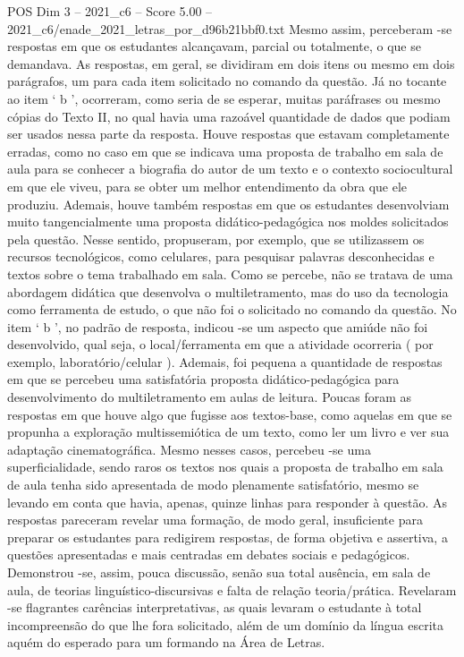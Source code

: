 \begin{textsample}{POS Dim 3 – 2021\_c6 – Score 5.00 – 2021\_c6/enade\_2021\_letras\_por\_d96b21bbf0.txt}
Mesmo assim, perceberam -se respostas em que os estudantes alcançavam, parcial ou totalmente, o que se demandava.
As respostas, em geral, se dividiram em dois itens ou mesmo em dois parágrafos, um para cada item solicitado no comando da questão.
Já no tocante ao item ‘ b ’, ocorreram, como seria de se esperar, muitas paráfrases ou mesmo cópias do Texto II, no qual havia uma razoável quantidade de dados que podiam ser usados nessa parte da resposta.
Houve respostas que estavam completamente erradas, como no caso em que se indicava uma proposta de trabalho em sala de aula para se conhecer a biografia do autor de um texto e o contexto sociocultural em que ele viveu, para se obter um melhor entendimento da obra que ele produziu.
Ademais, houve também respostas em que os estudantes desenvolviam muito tangencialmente uma proposta didático-pedagógica nos moldes solicitados pela questão.
Nesse sentido, propuseram, por exemplo, que se utilizassem os recursos tecnológicos, como celulares, para pesquisar palavras desconhecidas e textos sobre o tema trabalhado em sala.
Como se percebe, não se tratava de uma abordagem didática que desenvolva o multiletramento, mas do uso da tecnologia como ferramenta de estudo, o que não foi o solicitado no comando da questão.
No item ‘ b ’, no padrão de resposta, indicou -se um aspecto que amiúde não foi desenvolvido, qual seja, o local/ferramenta em que a atividade ocorreria ( por exemplo, laboratório/celular ).
Ademais, foi pequena a quantidade de respostas em que se percebeu uma satisfatória proposta didático-pedagógica para desenvolvimento do multiletramento em aulas de leitura.
Poucas foram as respostas em que houve algo que fugisse aos textos-base, como aquelas em que se propunha a exploração multissemiótica de um texto, como ler um livro e ver sua adaptação cinematográfica.
Mesmo nesses casos, percebeu -se uma superficialidade, sendo raros os textos nos quais a proposta de trabalho em sala de aula tenha sido apresentada de modo plenamente satisfatório, mesmo se levando em conta que havia, apenas, quinze linhas para responder à questão.
As respostas pareceram revelar uma formação, de modo geral, insuficiente para preparar os estudantes para redigirem respostas, de forma objetiva e assertiva, a questões apresentadas e mais centradas em debates sociais e pedagógicos.
Demonstrou -se, assim, pouca discussão, senão sua total ausência, em sala de aula, de teorias linguístico-discursivas e falta de relação teoria/prática.
Revelaram -se flagrantes carências interpretativas, as quais levaram o estudante à total incompreensão do que lhe fora solicitado, além de um domínio da língua escrita aquém do esperado para um formando na Área de Letras.

\end{textsample}
